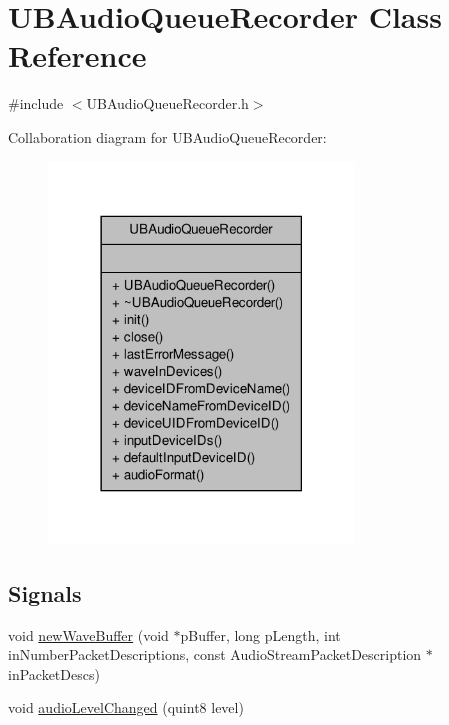 \hypertarget{class_u_b_audio_queue_recorder}{\section{U\-B\-Audio\-Queue\-Recorder Class Reference}
\label{de/d2b/class_u_b_audio_queue_recorder}
}


{\ttfamily \#include $<$U\-B\-Audio\-Queue\-Recorder.\-h$>$}



Collaboration diagram for U\-B\-Audio\-Queue\-Recorder\-:
\nopagebreak
\begin{figure}[H]
\begin{center}
\leavevmode
\includegraphics[width=230pt]{dd/d60/class_u_b_audio_queue_recorder__coll__graph}
\end{center}
\end{figure}
\subsection*{Signals}
\begin{DoxyCompactItemize}
\item 
void \hyperlink{class_u_b_audio_queue_recorder_a059864bee688ab31715d3f8a59393df9}{new\-Wave\-Buffer} (void $\ast$p\-Buffer, long p\-Length, int in\-Number\-Packet\-Descriptions, const Audio\-Stream\-Packet\-Description $\ast$in\-Packet\-Descs)
\item 
void \hyperlink{class_u_b_audio_queue_recorder_a0090a62acc8663b85529126fc632bee5}{audio\-Level\-Changed} (quint8 level)
\end{DoxyCompactItemize}
